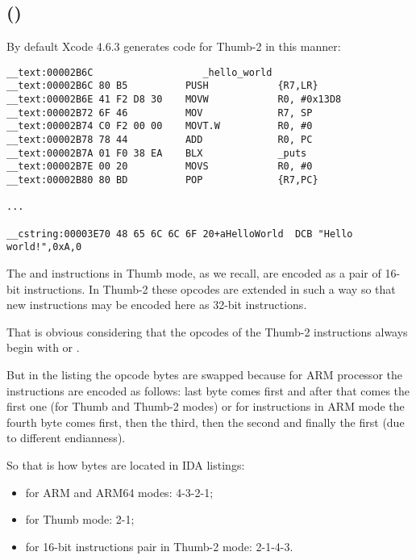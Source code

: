 \subsection{\OptimizingXcodeIV (\ThumbTwoMode)}

By default Xcode 4.6.3 generates code for Thumb-2 in this manner:

\begin{lstlisting}[caption=\OptimizingXcodeIV (\ThumbTwoMode)]
__text:00002B6C                   _hello_world
__text:00002B6C 80 B5          PUSH            {R7,LR}
__text:00002B6E 41 F2 D8 30    MOVW            R0, #0x13D8
__text:00002B72 6F 46          MOV             R7, SP
__text:00002B74 C0 F2 00 00    MOVT.W          R0, #0
__text:00002B78 78 44          ADD             R0, PC
__text:00002B7A 01 F0 38 EA    BLX             _puts
__text:00002B7E 00 20          MOVS            R0, #0
__text:00002B80 80 BD          POP             {R7,PC}

...

__cstring:00003E70 48 65 6C 6C 6F 20+aHelloWorld  DCB "Hello world!",0xA,0
\end{lstlisting}


\myindex{\ThumbTwoMode}

The  and  instructions in Thumb mode, as we recall, are encoded as a pair of 16-bit instructions.
In Thumb-2 these  opcodes are extended in such a way so that new instructions may be encoded here as 32-bit instructions.

That is obvious considering that the opcodes of the Thumb-2 instructions always begin with  or .

But in the \IDA listing
the opcode bytes are swapped because for ARM processor the instructions are encoded as follows: 
last byte comes first and after that comes the first one (for Thumb and Thumb-2 modes) 
or for instructions in ARM mode the fourth byte comes first, then the third,
then the second and finally the first (due to different \gls{endianness}).

So that is how bytes are located in IDA listings:
\begin{itemize}
\item for ARM and ARM64 modes: 4-3-2-1;
\item for Thumb mode: 2-1;
\item for 16-bit instructions pair in Thumb-2 mode: 2-1-4-3.
\end{itemize}

